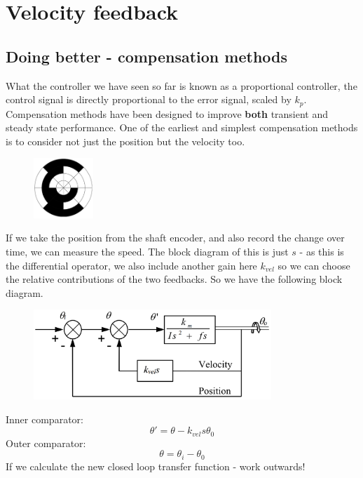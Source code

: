 \documentclass[class=report, crop=false, 12pt,a4paper]{standalone}
\begin{document}
\section{Velocity feedback}
\subsection{Doing better - compensation methods}
What the controller we have seen so far is known as a proportional controller, the control signal is directly proportional to the error signal, scaled by $k_p$. Compensation methods have been designed to improve \textbf{both} transient and steady state performance. One of the earliest and simplest compensation methods is to consider not just the position but the velocity too. 
\begin{figure}[H]
  \centerline{\includegraphics[width = 0.2\textwidth]{../img/diagram110.png}}
  \caption{}
\end{figure}
If we take the position from the shaft encoder, and also record the change over time, we can measure the speed. The block diagram of this is just $s$ - as this is the differential operator, we also include another gain here $k_{vel}$ so we can choose the relative contributions of the two feedbacks. So we have the following block diagram.
\begin{figure}[H]
  \centerline{\includegraphics[width = 0.8\textwidth]{../img/diagram111.png}}
  \caption{}
\end{figure}
Inner comparator:
\begin{equation}
  \theta ' = \theta - k_{vel} s \theta_0
\end{equation}
Outer comparator:
\begin{equation}
  \theta = \theta_i - \theta_0
\end{equation}
If we calculate the new closed loop transfer function - work outwards!
\end{document}
